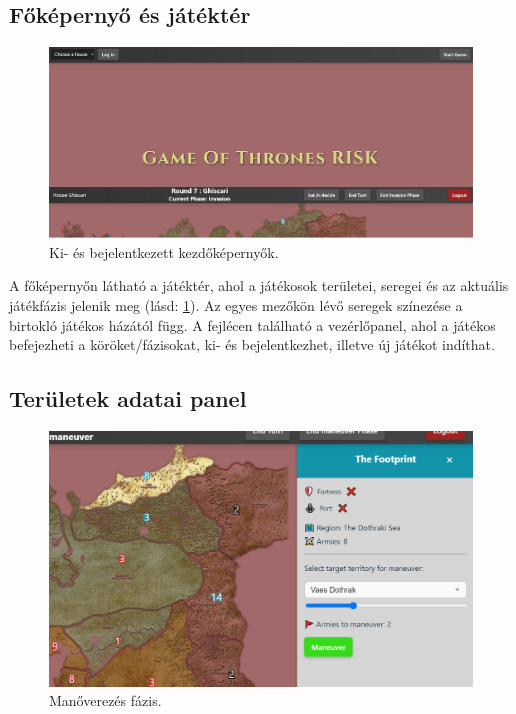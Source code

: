 \documentclass[
]{thesis-ekf}
\theoremstyle{definition}
\theoremstyle{remark}
\begin{document}
	\subsection*{Főképernyő és játéktér}
		
	\begin{figure}[ht!]
		\centering
		\includegraphics[width=16cm]{kezdokepernyo.png}
		\caption{Ki- és bejelentkezett kezdőképernyők.}
		\label{kezdokepernyo}
	\end{figure}
	
	A főképernyőn látható a játéktér, ahol a játékosok területei, seregei és az aktuális játékfázis jelenik meg (lásd: \ref{kezdokepernyo}). Az egyes mezőkön lévő seregek színezése a birtokló játékos házától függ. A fejlécen található a vezérlőpanel, ahol a játékos befejezheti a köröket/fázisokat, ki- és bejelentkezhet, illetve új játékot indíthat.
	
	\subsection*{Területek adatai panel}
	
	\begin{figure}[ht!]
		\centering
		\includegraphics[width=16cm]{manover.png}
		\caption{Manőverezés fázis.}
		\label{manover}
	\end{figure}
	
\end{document}

